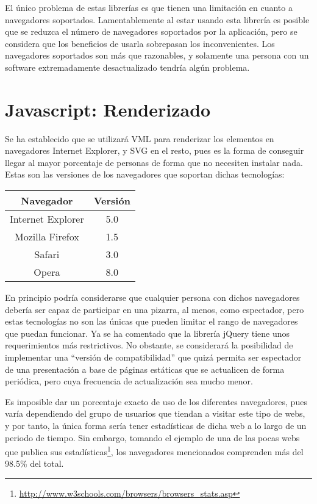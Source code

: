 El único problema de estas librerías es que tienen una limitación en cuanto a navegadores soportados. Lamentablemente al estar usando esta librería es posible que se reduzca el número de navegadores soportados por la aplicación, pero se considera que los beneficios de usarla sobrepasan los inconvenientes. Los navegadores soportados son más que razonables, y solamente una persona con un software extremadamente desactualizado tendría algún problema.

\section{Javascript: Renderizado}
Se ha establecido que se utilizará VML para renderizar los elementos en navegadores Internet Explorer, y SVG en el resto, pues es la forma de conseguir llegar al mayor porcentaje de personas de forma que no necesiten instalar nada. Estas son las versiones de los navegadores que soportan dichas tecnologías:

\begin{table}[h]
	\centering
		\begin{tabular}{|c|c|}
			\hline
			Navegador & Versión \\
			\hline
			Internet Explorer & 5.0 \\
			\hline
			Mozilla Firefox & 1.5 \\
			\hline
			Safari & 3.0 \\
			\hline
			Opera & 8.0 \\
			\hline
		\end{tabular}
\end{table}

En principio podría considerarse que cualquier persona con dichos navegadores debería ser capaz de participar en una pizarra, al menos, como espectador, pero estas tecnologías no son las únicas que pueden limitar el rango de navegadores que puedan funcionar. Ya se ha comentado que la librería jQuery tiene unos requerimientos más restrictivos. No obstante, se considerará la posibilidad de implementar una ``versión de compatibilidad'' que quizá permita ser espectador de una presentación a base de páginas estáticas que se actualicen de forma periódica, pero cuya frecuencia de actualización sea mucho menor.

Es imposible dar un porcentaje exacto de uso de los diferentes navegadores, pues varía dependiendo del grupo de usuarios que tiendan a visitar este tipo de webs, y por tanto, la única forma sería tener estadísticas de dicha web a lo largo de un periodo de tiempo. Sin embargo, tomando el ejemplo de una de las pocas webs que publica sus estadísticas\footnote{\url{http://www.w3schools.com/browsers/browsers_stats.asp}}, los navegadores mencionados comprenden más del 98.5\% del total.

